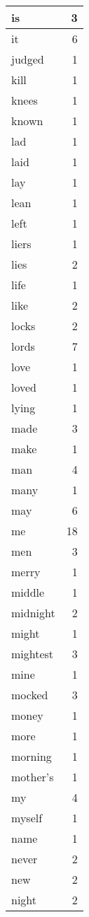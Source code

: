 \begin{center}
\begin{longtable}{l|r}
is & 3\\ \hline 
it & 6\\ \hline 
judged & 1\\ \hline 
kill & 1\\ \hline 
knees & 1\\ \hline 
known & 1\\ \hline 
lad & 1\\ \hline 
laid & 1\\ \hline 
lay & 1\\ \hline 
lean & 1\\ \hline 
left & 1\\ \hline 
liers & 1\\ \hline 
lies & 2\\ \hline 
life & 1\\ \hline 
like & 2\\ \hline 
locks & 2\\ \hline 
lords & 7\\ \hline 
love & 1\\ \hline 
loved & 1\\ \hline 
lying & 1\\ \hline 
made & 3\\ \hline 
make & 1\\ \hline 
man & 4\\ \hline 
many & 1\\ \hline 
may & 6\\ \hline 
me & 18\\ \hline 
men & 3\\ \hline 
merry & 1\\ \hline 
middle & 1\\ \hline 
midnight & 2\\ \hline 
might & 1\\ \hline 
mightest & 3\\ \hline 
mine & 1\\ \hline 
mocked & 3\\ \hline 
money & 1\\ \hline 
more & 1\\ \hline 
morning & 1\\ \hline 
mother's & 1\\ \hline 
my & 4\\ \hline 
myself & 1\\ \hline 
name & 1\\ \hline 
never & 2\\ \hline 
new & 2\\ \hline 
night & 2\\ \hline 

\end{longtable}
\end{center}
